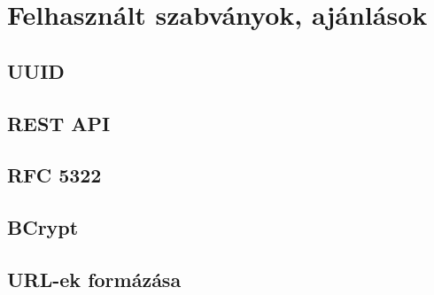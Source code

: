 \section{Felhasznált szabványok, ajánlások}

\subsection{UUID}

\subsection{REST API}

\subsection{RFC 5322}

\subsection{BCrypt}

\subsection{URL-ek formázása}
